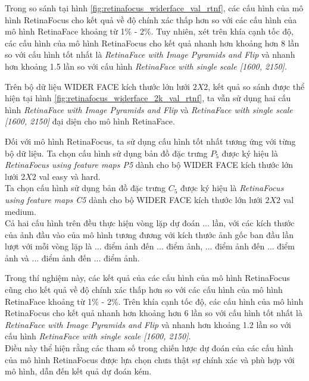 {    \noindent
    Trong so sánh tại hình \ref{fig:retinafocus_widerface_val_rtnf}, các cấu hình của mô hình RetinaFocus cho kết quả về độ chính xác thấp hơn so với các cấu hình của mô hình RetinaFace khoảng từ 1\% - 2\%.
    Tuy nhiên, xét trên khía cạnh tốc độ, các cấu hình của mô hình RetinaFocus cho kết quả nhanh hơn khoảng hơn 8 lần so với cấu hình tốt nhất là \textit{RetinaFace with Image Pyramids and Flip} và nhanh hơn khoảng 1.5 lần so với cấu hình \textit{RetinaFace with single scale [1600, 2150]}.

    \noindent
    Trên bộ dữ liệu WIDER FACE kích thước lớn lưới $2 X 2$, kết quả so sánh được thể hiện tại hình \ref{fig:retinafocus_widerface_2k_val_rtnf}, ta vẫn sử dụng hai cấu hình \textit{RetinaFace with Image Pyramids and Flip} và \textit{RetinaFace with single scale [1600, 2150]} đại diện cho mô hình RetinaFace.

    \noindent
    Đối với mô hình RetinaFocus, ta sử dụng cấu hình tốt nhất tương ứng với từng bộ dữ liệu.
    Ta chọn cấu hình sử dụng bản đồ đặc trưng $P_5$ được ký hiệu là \textit{RetinaFocus using feature maps P5} dành cho bộ WIDER FACE kích thước lớn lưới $2 X 2$ val easy và hard. \\
    Ta chọn cấu hình sử dụng bản đồ đặc trưng $C_5$ được ký hiệu là \textit{RetinaFocus using feature maps C5} dành cho bộ WIDER FACE kích thước lớn lưới $2 X 2$ val medium. \\
    Cả hai cấu hình trên đều thực hiện vòng lặp dự đoán ... lần, với các kích thước của ảnh đầu vào của mô hình tương đương với kích thước ảnh gốc ban đầu lần lượt với mỗi vòng lặp là ... điểm ảnh đến ... điểm ảnh, ... điểm ảnh đến ... điểm ảnh và ... điểm ảnh đến ... điểm ảnh.

    \noindent
    Trong thí nghiệm này, các kết quả của các cấu hình của mô hình RetinaFocus cũng cho kết quả về độ chính xác thấp hơn so với các cấu hình của mô hình RetinaFace khoảng từ 1\% - 2\%.
    Trên khía cạnh tốc độ, các cấu hình của mô hình RetinaFocus cho kết quả nhanh hơn khoảng hơn 6 lần so với cấu hình tốt nhất là \textit{RetinaFace with Image Pyramids and Flip} và nhanh hơn khoảng 1.2 lần so với cấu hình \textit{RetinaFace with single scale [1600, 2150]}. \\
    Điều này thể hiện rằng các tham số trong chiến lược dự đoán của các cấu hình của mô hình RetinaFocus được lựa chọn chưa thật sự chính xác và phù hợp với mô hình, dẫn đến kết quả dự đoán kém.

}
